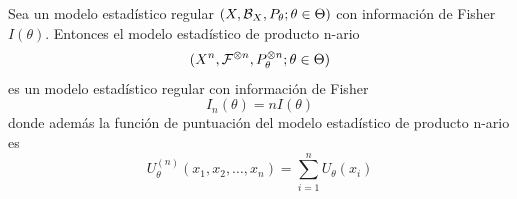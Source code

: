 \begin{prop}
    Sea un modelo estadístico regular $(X, \mathcal{B}_{X}, P_{\theta}; \theta \in \Theta)$ con información de Fisher $I(\theta)$. Entonces el modelo estadístico de producto n-ario
    \begin{equation*}
        (X^n, \mathcal{F}^{\otimes n}, P_{\theta}^{\otimes n}; \theta \in \Theta)
    \end{equation*}
    es un modelo estadístico regular con información de Fisher
    \begin{equation*}
        I_n(\theta) = n I(\theta)
    \end{equation*}
    donde además la función de puntuación del modelo estadístico de producto n-ario es
    \begin{equation*}
        U_{\theta}^{(n)}(x_1, x_2, \ldots, x_n) = \sum\limits_{i=1}^{n} U_{\theta}(x_i)
    \end{equation*}
\end{prop}

